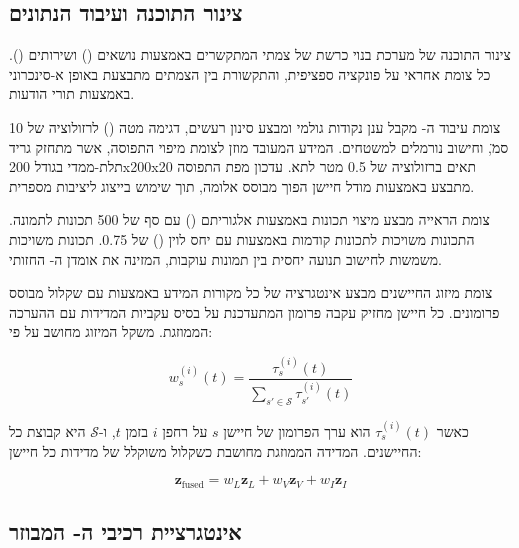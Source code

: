 \subsection{צינור התוכנה ועיבוד הנתונים}
\label{sec:ch07_software_pipeline}

צינור התוכנה של מערכת  בנוי כרשת של צמתי  המתקשרים באמצעות נושאים () ושירותים (). כל צומת אחראי על פונקציה ספציפית, והתקשורת בין הצמתים מתבצעת באופן א-סינכרוני באמצעות תורי הודעות.

צומת עיבוד ה- מקבל ענן נקודות גולמי ומבצע סינון רעשים, דגימה מטה () לרזולוציה של 10 ס\"מ, וחישוב נורמלים למשטחים. המידע המעובד מוזן לצומת מיפוי התפוסה, אשר מתחזק גריד תלת-ממדי בגודל 200x200x20 תאים ברזולוציה של 0.5 מטר לתא. עדכון מפת התפוסה מתבצע באמצעות מודל חיישן הפוך מבוסס אלומה, תוך שימוש בייצוג  ליציבות מספרית.

צומת הראייה מבצע מיצוי תכונות באמצעות אלגוריתם  () עם סף של 500 תכונות לתמונה. התכונות משויכות לתכונות קודמות באמצעות  עם יחס לוין () של 0.75. תכונות משויכות משמשות לחישוב תנועה יחסית בין תמונות עוקבות, המזינה את אומדן ה- החזותי.

צומת מיזוג החיישנים מבצע אינטגרציה של כל מקורות המידע באמצעות  עם שקלול מבוסס פרומונים. כל חיישן מחזיק עקבה פרומון המתעדכנת על בסיס עקביות המדידות עם ההערכה הממוזגת. משקל המיזוג מחושב על פי:

\begin{equation}
w_{s}^{(i)}(t) = \frac{\tau_{s}^{(i)}(t)}{\sum_{s' \in \mathcal{S}} \tau_{s'}^{(i)}(t)}
\label{eq:ch07_fusion_weight}
\end{equation}

כאשר $\tau_{s}^{(i)}(t)$ הוא ערך הפרומון של חיישן $s$ על רחפן $i$ בזמן $t$, ו-$\mathcal{S}$ היא קבוצת כל החיישנים. המדידה הממוזגת מחושבת כשקלול משוקלל של מדידות כל חיישן:

\begin{equation}
\mathbf{z}_{\text{fused}} = w_{L}\mathbf{z}_{L} + w_{V}\mathbf{z}_{V} + w_{I}\mathbf{z}_{I}
\label{eq:ch07_fused_measurement}
\end{equation}

\subsection{אינטגרציית רכיבי ה- המבוזר}
\label{sec:ch07_slam_integration}

